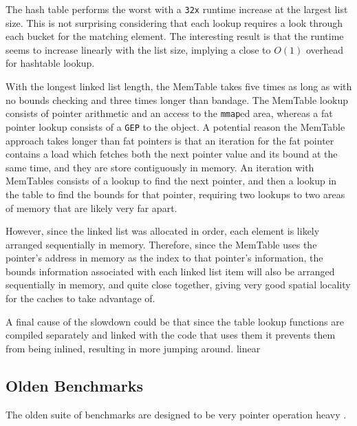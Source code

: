 The hash table performs the worst with a \verb!32x! runtime increase at the largest list size.
This is not surprising considering that each lookup requires a look through each bucket for the matching element.
The interesting result is that the runtime seems to increase linearly with the list size, implying a close to $O(1)$ overhead for hashtable lookup.

With the longest linked list length, the MemTable takes five times as long as with no bounds checking and three times longer than bandage.
The MemTable lookup consists of pointer arithmetic and an access to the \verb!mmap!ed area, whereas a fat pointer lookup consists of a \verb!GEP! to the object.
A potential reason the MemTable approach takes longer than fat pointers is that an iteration for the fat pointer contains a load which fetches both the next pointer value and its bound at the same time, and they are store contiguously in memory.
An iteration with MemTables consists of a lookup to find the next pointer, and then a lookup in the table to find the bounds for that pointer, requiring two lookups to two areas of memory that are likely very far apart.

However, since the linked list was allocated in order, each element is likely arranged sequentially in memory.
Therefore, since the MemTable uses the pointer's address in memory as the index to that pointer's information, the bounds information associated with each linked list item will also be arranged sequentially in memory, and quite close together, giving very good spatial locality for the caches to take advantage of.

A final cause of the slowdown could be that since the table lookup functions are compiled separately and linked with the code that uses them it prevents them from being inlined, resulting in more jumping around.
 linear

\subsection{Olden Benchmarks}

The olden suite of benchmarks are designed to be very pointer operation heavy \cite{olden}.

